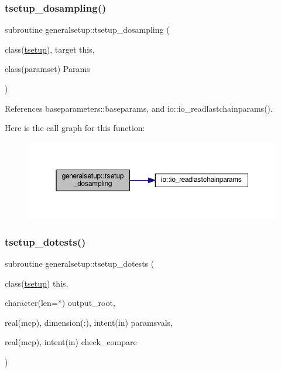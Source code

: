 \mbox{\label{namespacegeneralsetup_aa31d5951f5285c856d2291afcb518b01}} 
\subsubsection{\texorpdfstring{tsetup\+\_\+dosampling()}{tsetup\_dosampling()}}
{\footnotesize\ttfamily subroutine generalsetup\+::tsetup\+\_\+dosampling (\begin{DoxyParamCaption}\item[{class(\mbox{\hyperlink{structgeneralsetup_1_1tsetup}{tsetup}}), target}]{this,  }\item[{class(paramset)}]{Params }\end{DoxyParamCaption})}



References baseparameters\+::baseparams, and io\+::io\+\_\+readlastchainparams().

Here is the call graph for this function\+:
\nopagebreak
\begin{figure}[H]
\begin{center}
\leavevmode
\includegraphics[width=350pt]{namespacegeneralsetup_aa31d5951f5285c856d2291afcb518b01_cgraph}
\end{center}
\end{figure}
\mbox{\label{namespacegeneralsetup_a8fafc07faa08ebbfd2ba87e7737ac72f}} 
\subsubsection{\texorpdfstring{tsetup\+\_\+dotests()}{tsetup\_dotests()}}
{\footnotesize\ttfamily subroutine generalsetup\+::tsetup\+\_\+dotests (\begin{DoxyParamCaption}\item[{class(\mbox{\hyperlink{structgeneralsetup_1_1tsetup}{tsetup}})}]{this,  }\item[{character(len=$\ast$)}]{output\+\_\+root,  }\item[{real(mcp), dimension(\+:), intent(in)}]{paramsvals,  }\item[{real(mcp), intent(in)}]{check\+\_\+compare }\end{DoxyParamCaption})}



